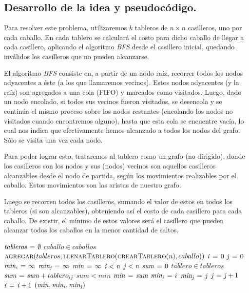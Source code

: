 \newpage
\subsection{Desarrollo de la idea y pseudocódigo.}

\vspace*{0.3cm}

Para resolver este problema, utilizaremos $k$ tableros de $n \times n$
casilleros, uno por cada caballo. En cada tablero se calculará el costo para
dicho caballo de llegar a cada casillero, aplicando el algoritmo \textit{BFS} desde el casillero inicial, quedando inválidos los casilleros que no pueden
alcanzarse.

El algoritmo \textit{BFS} consiste en, a partir de un nodo raíz,
recorrer todos los nodos adyacentes a éste (a los que llamaremos vecinos). Estos nodos adyacentes (y la raíz) son agregados a una cola (FIFO) y marcados como visitados. Luego, dado un nodo encolado, si todos sus vecinos fueron visitados, se desencola y se continúa el mismo proceso sobre los nodos restantes (encolando los nodos no visitados cuando encontremos alguno), hasta que esta cola se encuentre vacía, lo cual nos indica que efectivamente hemos alcanzado a todos los nodos del grafo. Sólo se visita una vez cada nodo.

Para poder lograr esto, trataremos al tablero como un grafo (no dirigido), donde los casilleros son los nodos y sus (nodos) vecinos son aquellos casilleros alcanzables desde el nodo de partida, según los movimientos realizables por el caballo. Estos movimientos son las aristas de nuestro grafo.

Luego se recorren todos los casilleros, sumando el valor de estos en todos
los tableros (si son alcanzables), obteniendo así el costo de cada casillero
para cada caballo. De existir, el mínimo de estos valores será el casillero
que pueden alcanzar todos los caballos en la menor cantidad de saltos.

\begin{codebox}
\li $\id{tableros} \gets \emptyset$
\li \For $caballo \in caballos$ \Do
\li   $\textnormal{\scshape agregar}(tableros,
                      \textnormal{\scshape llenarTablero}(\textnormal{\scshape crearTablero}(n),caballo))$
    \End
\li $\id{i} \gets 0$
\li $\id{j} \gets 0$
\li $\id{min_i} \gets \infty$
\li $\id{min_j} \gets \infty$
\li $\id{min} \gets \infty$
\li \While $\id{i} < \id{n}$ \Do
\li   \While $\id{j} < \id{n}$ \Do
\li     $\id{sum} \gets 0$
\li     \For $tablero \in tableros$ \Do
\li         $\id{sum} \gets \id{sum} + tablero_{ij}$
        \End
\li     \If $sum < min$ \Then
\li       $\id{min} \gets \id{sum}$
\li       $\id{min_i} \gets i$
\li       $\id{min_j} \gets j$
        \End
\li   $\id{j} \gets \id{j} + 1$
      \End
\li $\id{i} \gets \id{i} + 1$
    \End
\li \Return $(\id{min}, \id{min_i}, \id{min_j})$
\end{codebox}


